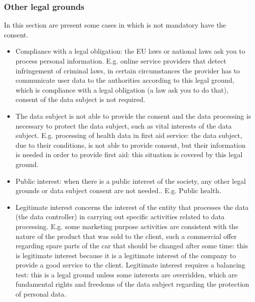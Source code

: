 \subsubsection{Other legal grounds}
In this section are present some cases in which is not mandatory have the consent.
\begin{itemize}
    \item Compliance with a legal obligation: the EU laws or national laws ask you to process personal information. E.g. online service providers that detect infringement of criminal laws, in certain circumstances the provider has to communicate user data to the authorities according to this legal ground, which is compliance with a legal obligation (a law ask you to do that), consent of the data subject is not required.
    \item The data subject is not able to provide the consent and the data processing is necessary to protect the data subject, such as vital interests of the data subject. E.g. processing of health data in first aid service: the data subject, due to their conditions, is not able to provide consent, but their information is needed in order to provide first aid: this situation is covered by this legal ground.
    \item Public interest: when there is a public interest of the society, any other legal grounds or data subject consent are not needed.. E.g. Public health.
    \item Legitimate interest concerns the interest of the entity that processes the data (the data controller) in carrying out specific activities related to data processing.  E.g. some marketing purpose activities are consistent with the nature of the product that was sold to the client, such a commercial offer regarding spare parts of the car that should be changed after some time: this is legitimate interest because it is a legitimate interest of the company to provide a good service to the client. Legitimate interest requires a balancing test: this is a legal ground unless some interests are overridden, which are fundamental rights and freedoms of the data subject regarding the protection of personal data.
\end{itemize}

